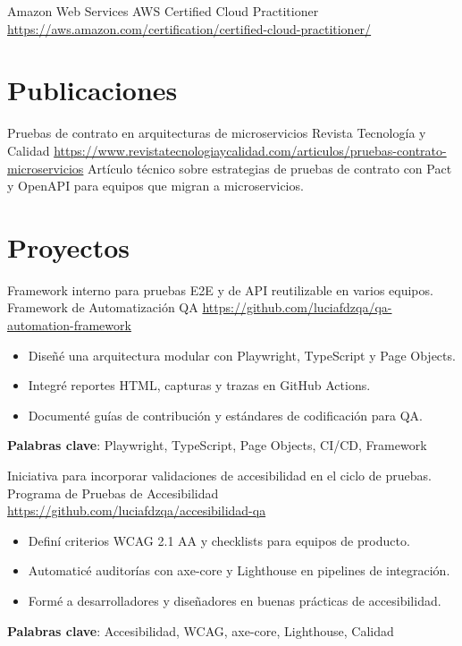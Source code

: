 \documentclass[a4paper, serif, 10pt]{moderncv}
\begin{document}
        {Amazon Web Services}
        {AWS Certified Cloud Practitioner}
        {\url{https://aws.amazon.com/certification/certified-cloud-practitioner/}}
        {}
        {}
\section{Publicaciones}

        {Pruebas de contrato en arquitecturas de microservicios}
        {Revista Tecnología y Calidad}
        {\url{https://www.revistatecnologiaycalidad.com/articulos/pruebas-contrato-microservicios}}
        {}
        {Artículo técnico sobre estrategias de pruebas de contrato con Pact y OpenAPI para equipos que migran a microservicios.}
\section{Proyectos}

        {Framework interno para pruebas E2E y de API reutilizable en varios equipos.}
        {Framework de Automatización QA}
        {\url{https://github.com/luciafdzqa/qa-automation-framework}}
        {}
        {\begin{itemize}
\item Diseñé una arquitectura modular con Playwright, TypeScript y Page Objects.
\item Integré reportes HTML, capturas y trazas en GitHub Actions.
\item Documenté guías de contribución y estándares de codificación para QA.
\end{itemize}
\textbf{Palabras clave}: Playwright, TypeScript, Page Objects, CI/CD, Framework}

        {Iniciativa para incorporar validaciones de accesibilidad en el ciclo de pruebas.}
        {Programa de Pruebas de Accesibilidad}
        {\url{https://github.com/luciafdzqa/accesibilidad-qa}}
        {}
        {\begin{itemize}
\item Definí criterios WCAG 2.1 AA y checklists para equipos de producto.
\item Automaticé auditorías con axe-core y Lighthouse en pipelines de integración.
\item Formé a desarrolladores y diseñadores en buenas prácticas de accesibilidad.
\end{itemize}
\textbf{Palabras clave}: Accesibilidad, WCAG, axe-core, Lighthouse, Calidad}
\end{document}
